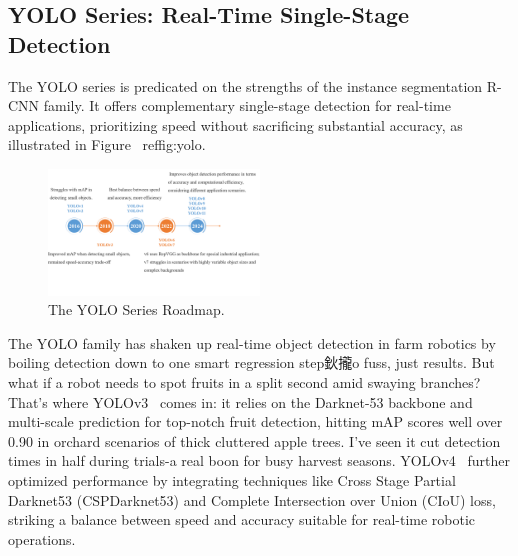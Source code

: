 \documentclass[a4paper,fleqn]{cas-dc}
\begin{document}
\subsection{YOLO Series: Real-Time Single-Stage Detection}
The YOLO series is predicated on the strengths of the instance segmentation R-CNN family. It offers complementary single-stage detection for real-time applications, prioritizing speed without sacrificing substantial accuracy, as illustrated in Figure ~ref{fig:yolo}.
\begin{figure}[hbtp]
\centering
\includegraphics[width=0.5\textwidth]{fig_yolo.png}
\caption{The YOLO Series Roadmap.}
\label{fig:yolo}
\end{figure}

The YOLO family has shaken up real-time object detection in farm robotics by boiling detection down to one smart regression step鈥攏o fuss, just results. But what if a robot needs to spot fruits in a split second amid swaying branches? That's where YOLOv3~\cite{redmon2018yolov3} comes in: 
it relies on the Darknet-53 backbone and multi-scale prediction for top-notch fruit detection, hitting mAP scores well over 0.90 in orchard scenarios of thick cluttered apple trees. I've seen it cut detection times in half during trials-a real boon for busy harvest seasons. YOLOv4~\cite{bochkovskiy2020yolov4} further optimized performance by integrating techniques like Cross Stage Partial Darknet53 (CSPDarknet53) and Complete Intersection over Union (CIoU) loss, striking a balance between speed and accuracy suitable for real-time robotic operations. 
\end{document}
